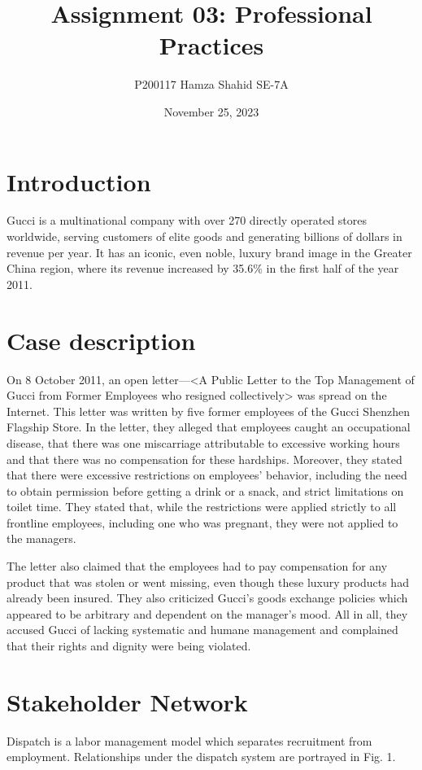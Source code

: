 \documentclass{article}
\title{Assignment 03: Professional Practices}
\author{P200117 Hamza Shahid SE-7A}
\date{November 25, 2023}
\begin{document}
\maketitle

\section{Introduction}
Gucci is a multinational company with over 270 directly operated stores worldwide, serving customers of elite goods and generating billions of dollars in revenue per year. It has an iconic, even noble, luxury brand image in the Greater China region, where its revenue increased by 35.6\% in the first half of the year 2011.

\section{Case description}
On 8 October 2011, an open letter—<A Public Letter to the Top Management of Gucci from Former Employees who resigned collectively> was spread on the Internet. This letter was written by five former employees of the Gucci Shenzhen Flagship Store. In the letter, they alleged that employees caught an occupational disease, that there was one miscarriage attributable to excessive working hours and that there was no compensation for these hardships. Moreover, they stated that there were excessive restrictions on employees’ behavior, including the need to obtain permission before getting a drink or a snack, and strict limitations on toilet time. They stated that, while the restrictions were applied strictly to all frontline employees, including one who was pregnant, they were not applied to the managers.

The letter also claimed that the employees had to pay compensation for any product that was stolen or went missing, even though these luxury products had already been insured. They also criticized Gucci’s goods exchange policies which appeared to be arbitrary and dependent on the manager’s mood. All in all, they accused Gucci of lacking systematic and humane management and complained that their rights and dignity were being violated.

\section{Stakeholder Network}
Dispatch is a labor management model which separates recruitment from employment. Relationships under the dispatch system are portrayed in Fig. 1. 
\end{document}
